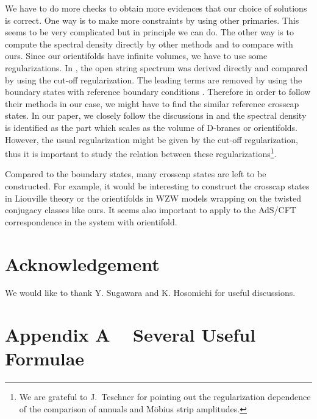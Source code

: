 \documentclass[a4paper,12pt]{article}
\def\theequation{\thesection.\arabic{equation}}
\begin{document}
We have to do more checks to obtain more evidences that our choice of
solutions is correct. One way is to make more constraints by using
other primaries. This seems to be very complicated but in principle we
can do. 
The other way is to compute the spectral density directly 
by other methods and to compare with ours. 
Since our orientifolds have infinite
volumes, we have to use some regularizations. In \cite{PST}, the open
string spectrum was derived directly and compared by using the cut-off
regularization. The leading terms are removed by using the
boundary states with reference boundary conditions \myHighlight{$\Theta_{*}$}\coordHE{}.
Therefore in order to follow their methods in our case,
we might have to find the similar reference crosscap states.
In our paper, we closely follow the discussions in \cite{LOP} and
the spectral density is identified as the part which scales as the volume of
D-branes or orientifolds. However, the usual regularization might be
given by the cut-off regularization, thus it is important to study the
relation between these regularizations\footnote{
We are grateful to J.~Teschner for pointing out the regularization
dependence of the comparison of annuals and M\"{o}bius strip amplitudes.}.

Compared to the boundary states, many crosscap states are left to be  
constructed. For example, it would be interesting to construct the
crosscap states in Liouville theory or the orientifolds in \coordHE{} WZW
models wrapping on the twisted conjugacy classes like ours.
It seems also important to apply to the AdS/CFT correspondence in
the system with orientifold. 


\section*{Acknowledgement}
\indent

We would like to thank Y. Sugawara and K. Hosomichi for useful
discussions.


\section*{Appendix A ~ Several Useful Formulae}
\setcounter{equation}{0}
\def\theequation{A.\arabic{equation}}
\indent
\end{document}
